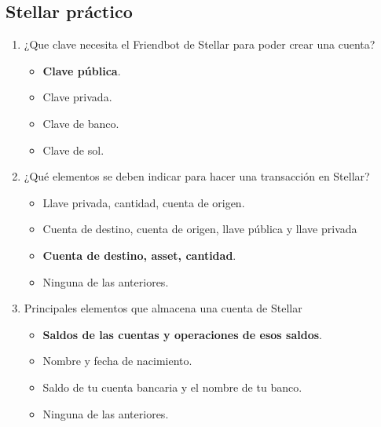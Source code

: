 \documentclass[a4paper,12pt]{/home/armando/Documentos/Cursos/LaTeX/Plantillas/lib/pub}
\begin{document}
\subsection{Stellar práctico}
\begin{enumerate}
	\item  ¿Que clave necesita el Friendbot de Stellar para poder crear una cuenta?
	\begin{itemize}
		\item \textbf{Clave pública}.
		\item Clave privada.
		\item Clave de banco.
		\item Clave de sol.
	\end{itemize}
	\item  ¿Qué elementos se deben indicar para hacer una transacción en Stellar?
	\begin{itemize}
		\item Llave privada, cantidad, cuenta de origen.
		\item Cuenta de destino, cuenta de origen, llave pública y llave privada
		\item \textbf{Cuenta de destino, asset, cantidad}.
		\item Ninguna de las anteriores.
	\end{itemize}
	\item Principales elementos que almacena una cuenta de Stellar
	\begin{itemize}
		\item \textbf{Saldos de las cuentas y operaciones de esos saldos}.
		\item Nombre y fecha de nacimiento.
		\item Saldo de tu cuenta bancaria y el nombre de tu banco.
		\item Ninguna de las anteriores.
	\end{itemize}
\end{enumerate}
\end{document}
